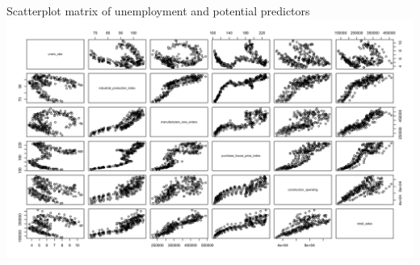 \documentclass[ignorenonframetext]{beamer}
\begin{document}
\begin{frame}{Scatterplot matrix of unemployment and potential predictors}
		\includegraphics[width=\linewidth]{images/pred_scatt}
\end{frame}
\end{document}
